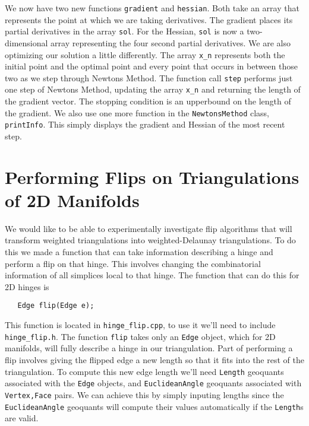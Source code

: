 \documentclass{amsart}
\theoremstyle{plain}
\numberwithin{equation}{section}
\begin{document}
\bigskip

We now have two new functions \verb|gradient| and \verb|hessian|. Both take an array that represents the point at which we are taking derivatives. The gradient places its partial derivatives in the array \verb|sol|. For the Hessian, \verb|sol| is now a two-dimensional array representing the four second partial derivatives. We are also optimizing our solution a little differently. The array \verb|x_n| represents both the initial point and the optimal point and every point that occurs in between those two as we step through Newtons Method. The function call \verb|step| performs just one step of Newtons Method, updating the array \verb|x_n| and returning the length of the gradient vector. The stopping condition is an upperbound on the length of the gradient. We also use one more function in the \verb|NewtonsMethod| class, \verb|printInfo|. This simply displays the gradient and Hessian of the most recent step.\\

\section*{Performing Flips on Triangulations of 2D Manifolds}

We would like to be able to experimentally investigate flip algorithms that will transform weighted triangulations into weighted-Delaunay triangulations. To do this we made a function that can take information describing a hinge and perform a flip on that hinge. This involves changing the combinatorial information of all simplices local to that hinge. The function that can do this for 2D hinges is\\

\begin{verbatim}
   Edge flip(Edge e);
\end{verbatim}

\bigskip

This function is located in \verb|hinge_flip.cpp|, to use it we'll need to include \verb|hinge_flip.h|. The function \verb|flip| takes only an \verb|Edge| object, which for 2D manifolds, will fully describe a hinge in our triangulation. Part of performing a flip involves giving the flipped edge a new length so that it fits into the rest of the triangulation. To compute this new edge length we'll need \verb|Length| geoquants associated with the \verb|Edge| objects, and \verb|EuclideanAngle| geoquants associated with \verb|Vertex,Face| pairs. We can achieve this by simply inputing lengths since the \verb|EuclideanAngle| geoquants will compute their values automatically if the \verb|Length|s are valid.
\end{document}
